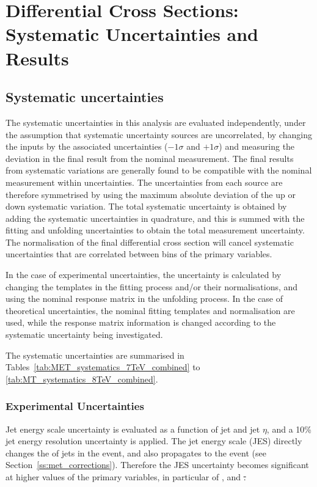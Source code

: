 \chapter{Differential Cross Sections: Systematic Uncertainties and Results}
\label{c:Differential_Cross_Section:systematics_and_results}

\section{Systematic uncertainties}
\label{s:systematic_uncertainties}
The systematic uncertainties in this analysis are evaluated independently, under the assumption that
systematic uncertainty sources are uncorrelated, by changing the inputs by the associated uncertainties
($-1\sigma$ and $+1\sigma$) and measuring the deviation in the final result from the nominal measurement. The
final results from systematic variations are generally found to be compatible with the nominal measurement
within uncertainties. The uncertainties from each source are therefore symmetrised by using the maximum
absolute deviation of the up or down systematic variation. The total systematic uncertainty is obtained by
adding the systematic uncertainties in quadrature, and this is summed with the fitting and unfolding
uncertainties to obtain the total measurement uncertainty. The normalisation of the final differential cross
section will cancel systematic uncertainties that are correlated between bins of the primary variables.

In the case of experimental uncertainties, the uncertainty is calculated by changing the templates in the
fitting process and/or their normalisations, and using the nominal \MADGRAPH response matrix in the unfolding
process. In the case of theoretical uncertainties, the nominal fitting templates and normalisation are used,
while the response matrix information is changed according to the systematic uncertainty being investigated.

The systematic uncertainties are summarised in Tables~\ref{tab:MET_systematics_7TeV_combined} to
\ref{tab:MT_systematics_8TeV_combined}.

\subsection{Experimental Uncertainties}
\label{ss:experimental_uncertainties}

Jet energy scale uncertainty is evaluated as a function of jet \pt and jet $\eta$, and a 10\% jet energy
resolution uncertainty is applied. The jet energy scale (JES) directly changes the \pt of jets in
the event, and also propagates to the event \met (see
Section~\ref{ss:met_corrections}). Therefore the JES uncertainty becomes significant at higher
values of the primary variables, in particular of \met, \HT and \st.

